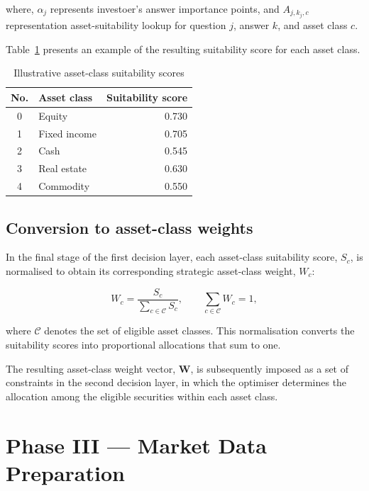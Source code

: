 \documentclass[11pt,a4paper]{article}
\begin{document}
where, $\alpha_j$ represents investoer's answer importance points, and $A_{j,k_j,c}$ representation asset-suitability lookup for question $j$, answer $k$, and asset class $c$.

Table~\ref{tab:asset-class-suitability-example} presents an example of the resulting suitability score for each asset class.

\begin{table}[H]
  \centering
  \caption{Illustrative asset-class suitability scores}
  \label{tab:asset-class-suitability-example}
  \begin{tabular}{clr}
    \toprule
    No. & Asset class & Suitability score \\
    \midrule
    0 & Equity & 0.730 \\
    1 & Fixed income & 0.705 \\
    2 & Cash & 0.545 \\
    3 & Real estate & 0.630 \\
    4 & Commodity & 0.550 \\
    \bottomrule
  \end{tabular}
\end{table}

\subsection{Conversion to asset-class weights}

In the final stage of the first decision layer, each asset-class suitability score, \(S_c\), is normalised to obtain its corresponding strategic asset-class weight, \(W_c\):

\begin{equation}
  W_c=\frac{S_c}{\sum_{c \in \mathcal{C}} S_c},
  \qquad
  \sum_{c \in \mathcal{C}} W_c=1,
\end{equation}

where \(\mathcal{C}\) denotes the set of eligible asset classes. This normalisation converts the suitability scores into proportional allocations that sum to one.

The resulting asset-class weight vector, \(\mathbf{W}\), is subsequently imposed as a set of constraints in the second decision layer, in which the optimiser determines the allocation among the eligible securities within each asset class.

\section{Phase III --- Market Data Preparation}
\label{sec:phase-three}
\end{document}
